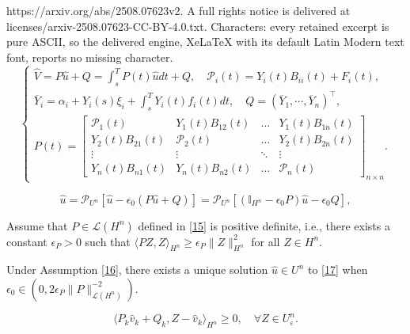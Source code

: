 \documentclass[10pt,a4paper]{amsart}
\begin{document}
https://arxiv.org/abs/2508.07623v2. A full rights notice is delivered at licenses/arxiv-2508.07623-CC-BY-4.0.txt. Characters: every retained excerpt is pure ASCII, so the delivered engine, XeLaTeX with its default Latin Modern text font, reports no missing character.
\begin{equation}\label{15}
\begin{cases}
\widehat{V}=P\widehat{u}+Q=\int_s^TP(t)\widehat{u}dt+Q,\quad \mathcal{P}_i(t)=Y_i(t)B_{ii}(t)+F_i(t),\\
\overline{Y}_i=\alpha_i+Y_{i}(s)\xi_{i}+\int_s^TY_{i}(t)f_{i}(t)dt,\quad Q=(\overline{Y}_1,\cdots,\overline{Y}_n)^{\top},\\
P(t)=\begin{bmatrix}
\mathcal{P}_1(t)& Y_1(t)B_{12}(t)&\dots & Y_1(t)B_{1n}(t)\\
  Y_2(t)B_{21}(t)& \mathcal{P}_2(t)&\dots & Y_2(t)B_{2n}(t)\\
\vdots &\vdots & \ddots&\vdots\\
Y_n(t)B_{n1}(t)&Y_n(t)B_{n2}(t)&\dots & \mathcal{P}_n(t)
\end{bmatrix}_{n \times n}.
\end{cases}
\end{equation}

\begin{equation}\label{17}
\widehat{u}=\mathcal{P}_{U^n}[\widehat{u}-\epsilon_0(P\widehat{u}+Q)]=\mathcal{P}_{U^n}[(\mathbb{I}_{H^n}-\epsilon_0P)\widehat{u}-\epsilon_0Q],
\end{equation}

\begin{assumption}\label{16}
Assume that $P\in \mathcal{L}(H^n)$ defined in \eqref{15} is positive definite, i.e., there exists a constant $\epsilon_P>0$ such that
$\langle PZ,Z\rangle_{H^n}\geq \epsilon_{P}\|Z\|^2_{H^n}$ for all $Z\in H^{n}$.
\end{assumption}

\begin{thm}\label{29}
Under Assumption \ref{16}, there exists a unique solution $\widehat{u}\in U^n$ to \eqref{17} when $\epsilon_0\in(0,2\epsilon_P\|P\|_{\mathcal{L}(H^n)}^{-2})$.
\end{thm}

\begin{equation}\label{35}
\langle P_k\widehat{v}_k+Q_k,Z-\widehat{v}_k\rangle_{H^n}\geq 0,\quad \forall Z\in U^n_{\varepsilon}.
\end{equation}
\end{document}
